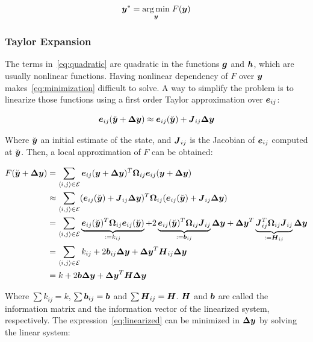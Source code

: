 \begin{equation}
\boldsymbol{y}^* = \underset{\boldsymbol{y}}{\arg\min} \;F(\boldsymbol{y})
\label{eq:minimization}
\end{equation}

\subsubsection{Taylor Expansion}

The terms in~\eqref{eq:quadratic} are quadratic in the functions $\boldsymbol{g}$ and $\boldsymbol{h}$, which are usually nonlinear functions. Having nonlinear dependency of $F$ over $\boldsymbol{y}$ makes~\eqref{eq:minimization} difficult to solve. A way to simplify the problem is to linearize those functions using a first order Taylor approximation over $\boldsymbol{e}_{ij}$:

\begin{equation}
\boldsymbol{e}_{ij}(\breve{\boldsymbol{y}}+\boldsymbol{\Delta y}) \approx \boldsymbol{e}_{ij}(\breve{\boldsymbol{y}}) + \boldsymbol{J}_{ij}\boldsymbol{\Delta y}
\end{equation}

Where $\breve{\boldsymbol{y}}$ an initial estimate of the state, and $\boldsymbol{J}_{ij}$ is the Jacobian of $\boldsymbol{e}_{ij}$ computed at $\breve{\boldsymbol{y}}$. Then, a local approximation of $F$ can be obtained:

\begin{align}
F(\breve{\boldsymbol{y}}+\boldsymbol{\Delta y}) &= \sum_{\left<i,j\right>\in\mathcal{E}}
\boldsymbol{e}_{ij}(\boldsymbol{y}+\boldsymbol{\Delta y})^T\boldsymbol{\Omega}_{ij} 
\boldsymbol{e}_{ij}(\boldsymbol{y}+\boldsymbol{\Delta y}) \notag \\
& \approx \sum_{\left<i,j\right>\in\mathcal{E}} 
(\boldsymbol{e}_{ij}(\breve{\boldsymbol{y}}) + \boldsymbol{J}_{ij}\boldsymbol{\Delta y})^T \boldsymbol{\Omega}_{ij}
(\boldsymbol{e}_{ij}(\breve{\boldsymbol{y}}) + \boldsymbol{J}_{ij}\boldsymbol{\Delta y})\notag \\
&= \sum_{\left<i,j\right>\in\mathcal{E}}
\underbrace{\boldsymbol{e}_{ij}(\breve{\boldsymbol{y}})^T\boldsymbol{\Omega}_{ij}\boldsymbol{e}_{ij}(\breve{\boldsymbol{y}})}_{\vcentcolon= k_{ij}}
+2\underbrace{\boldsymbol{e}_{ij}(\breve{\boldsymbol{y}})^T\boldsymbol{\Omega}_{ij}\boldsymbol{J}_{ij}}_{ \vcentcolon= \boldsymbol{b}_{ij}}\boldsymbol{\Delta y}
+\boldsymbol{\Delta y}^T
\underbrace{\boldsymbol{J}_{ij}^T\boldsymbol{\Omega}_{ij}\boldsymbol{J}_{ij}}_{\vcentcolon= \boldsymbol{H}_{ij}}
\boldsymbol{\Delta y} \notag \\
&= \sum_{\left<i,j\right>\in\mathcal{E}} k_{ij} + 2\boldsymbol{b}_{ij}\boldsymbol{\Delta y} + \boldsymbol{\Delta y}^T \boldsymbol{H}_{ij} \boldsymbol{\Delta y} \notag \\
&= k + 2\boldsymbol{b} \boldsymbol{\Delta y} + \boldsymbol{\Delta y}^T \boldsymbol{H} \boldsymbol{\Delta y}
\label{eq:linearized}
\end{align}

Where $\sum k_{ij} = k$, $\sum \boldsymbol{b}_{ij} = \boldsymbol{b}$ and $\sum \boldsymbol{H}_{ij} = \boldsymbol{H}$. $\boldsymbol{H}$ and $\boldsymbol{b}$ are called the information matrix and the information vector of the linearized system, respectively. The expression~\eqref{eq:linearized} can be minimized in $\boldsymbol{\Delta y}$ by solving the linear system:

